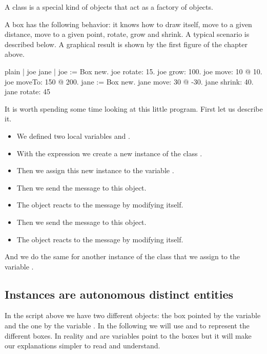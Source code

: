 \documentclass[10pt,twoside,english]{_support/latex/sbabook/sbabook}
\begin{document}
\begin{note}
A class is a special kind of objects that act as a factory of objects.
\end{note}

A box has the following behavior: it knows how to draw itself, move to a given distance, move to a given point, rotate, grow and shrink.  A
typical scenario is described below. A graphical result is shown by the first figure of the chapter above.

\begin{displaycode}{plain}
| joe jane |
joe := Box new.
joe rotate: 15.
joe grow: 100.
joe move: 10 @ 10.
joe moveTo: 150 @ 200. 
jane := Box new.
jane move: 30 @ -30.
jane shrink: 40.
jane rotate: 45
\end{displaycode}

It is worth spending some time looking at this little program. First let us describe it.

\begin{itemize}
\item We defined two local variables  and .
\item With the expression  we create a new instance of the class .
\item Then we assign this new instance to the variable .
\item Then we send the message  to this object.
\item The object reacts to the message by modifying itself.
\item Then we send the message  to this object.
\item The object reacts to the message by modifying itself.
\end{itemize}

And we do the same for another instance of the class  that we assign to the variable .
\subsection{Instances are autonomous distinct entities}
In the script above we have two different objects: the box pointed by the variable  and the one by the variable . 
In the following we will use  and  to represent the different boxes. In reality  and  are variables point to the boxes but it will make our explanations simpler to read and understand.  
\end{document}
